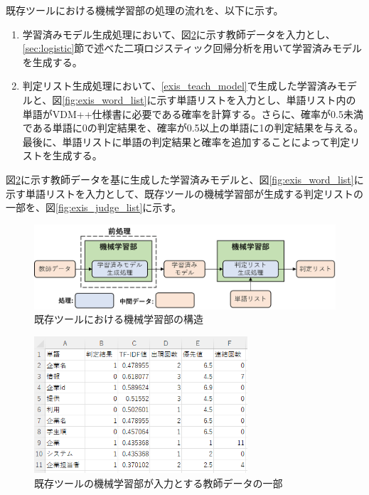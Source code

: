 既存ツールにおける機械学習部の処理の流れを、以下に示す。

\begin{enumerate}
    \item 学習済みモデル生成処理において、図\ref{fig:exis_teach}に示す教師データを入力とし、\ref{sec:logistic}節で述べた二項ロジスティック回帰分析を用いて学習済みモデルを生成する。
    \label{exis_teach_model}
    \item 判定リスト生成処理において、\ref{exis_teach_model}で生成した学習済みモデルと、図\ref{fig:exis_word_list}に示す単語リストを入力とし、単語リスト内の単語がVDM++仕様書に必要である確率を計算する。さらに、確率が0.5未満である単語に0の判定結果を、確率が0.5以上の単語に1の判定結果を与える。最後に、単語リストに単語の判定結果と確率を追加することによって判定リストを生成する。
\end{enumerate}

図\ref{fig:exis_teach}に示す教師データを基に生成した学習済みモデルと、図\ref{fig:exis_word_list}に示す単語リストを入力として、既存ツールの機械学習部が生成する判定リストの一部を、図\ref{fig:exis_judge_list}に示す。

\begin{figure}[tp]
    \begin{center}
        \includegraphics[width=1.0\columnwidth]{image/exis_machine_structure.png}
        \caption{既存ツールにおける機械学習部の構造}
        \label{fig:exis_machine_structure}
    \end{center}
\end{figure}

\begin{figure}[tp]
    \begin{center}
        \includegraphics[width=300]{image/exis_teach.png}
        \caption{既存ツールの機械学習部が入力とする教師データの一部}
        \label{fig:exis_teach}
    \end{center}
\end{figure}

